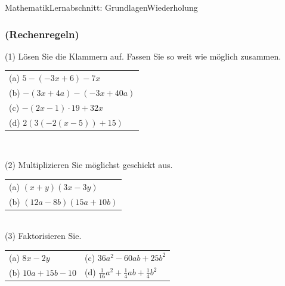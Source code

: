 \documentclass[11pt,twocolumn,oneside,openany,headings=optiontotoc,11pt,numbers=noenddot]{article}
\begin{document}
\begin{worksheet}{Mathematik}{Lernabschnitt: Grundlagen}{Wiederholung}
		\subsubsection*{(Rechenregeln)}
		(1) Lösen Sie die Klammern auf. Fassen Sie so weit wie möglich zusammen.\\
		\begin{tabularx}{0.5\textwidth}{X}
			(a) \(5-(-3x+6)-7x\)\\
			(b) \(-(3x+4a)-(-3x+40a)\)\\
			(c) \(-(2x-1)\cdot{}19 + 32x\)\\
			(d) \(2(3(-2(x-5))+15)\)
		\end{tabularx}\\
		\par\bigskip\noindent
		(2) Multiplizieren Sie möglichst geschickt aus.\\
		\begin{tabularx}{0.5\textwidth}{X}
			(a) \((x+y)(3x-3y)\)\\
			(b) \((12a-8b)(15a+10b)\)
		\end{tabularx}\\
		\newpage
		(3) Faktorisieren Sie.\\
		\begin{tabularx}{0.5\textwidth}{XX}
			(a) \(8x-2y\) & (c) \(36a^2 - 60ab +25b^2\)\\
			(b) \(10a + 15b -10\) & (d) \(\frac{1}{16}a^2 + \frac{1}{4}ab + \frac{1}{4}b^2\)
		\end{tabularx}

\end{worksheet}
\end{document}
